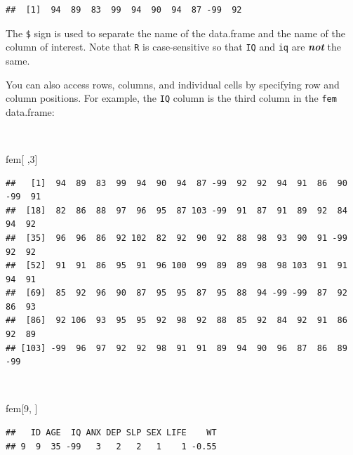 \documentclass[12pt,a4paper]{book}
\newenvironment{Shaded}{\begin{snugshade}}{\end{snugshade}}
\newcommand{\DecValTok}[1]{\textcolor[rgb]{0.00,0.00,0.81}{#1}}
\newcommand{\OperatorTok}[1]{\textcolor[rgb]{0.81,0.36,0.00}{\textbf{#1}}}
\newcommand{\NormalTok}[1]{#1}
\theoremstyle{definition}
\theoremstyle{definition}
\theoremstyle{definition}
\theoremstyle{remark}
\begin{document}
\begin{Shaded}
\end{Shaded}

\begin{verbatim}
##  [1]  94  89  83  99  94  90  94  87 -99  92
\end{verbatim}

\newpage

The \texttt{\$} sign is used to separate the name of the data.frame and
the name of the column of interest. Note that \texttt{R} is
case-sensitive so that \texttt{IQ} and \texttt{iq} are
\textbf{\emph{not}} the same.

You can also access rows, columns, and individual cells by specifying
row and column positions. For example, the \texttt{IQ} column is the
third column in the \texttt{fem} data.frame:

~

\begin{Shaded}
\begin{Highlighting}[]
\NormalTok{fem[ ,}\DecValTok{3}\NormalTok{]}
\end{Highlighting}
\end{Shaded}

\begin{verbatim}
##   [1]  94  89  83  99  94  90  94  87 -99  92  92  94  91  86  90 -99  91
##  [18]  82  86  88  97  96  95  87 103 -99  91  87  91  89  92  84  94  92
##  [35]  96  96  86  92 102  82  92  90  92  88  98  93  90  91 -99  92  92
##  [52]  91  91  86  95  91  96 100  99  89  89  98  98 103  91  91  94  91
##  [69]  85  92  96  90  87  95  95  87  95  88  94 -99 -99  87  92  86  93
##  [86]  92 106  93  95  95  92  98  92  88  85  92  84  92  91  86  92  89
## [103] -99  96  97  92  92  98  91  91  89  94  90  96  87  86  89 -99
\end{verbatim}

~

\begin{Shaded}
\begin{Highlighting}[]
\NormalTok{fem[}\DecValTok{9}\NormalTok{, ]}
\end{Highlighting}
\end{Shaded}

\begin{verbatim}
##   ID AGE  IQ ANX DEP SLP SEX LIFE    WT
## 9  9  35 -99   3   2   2   1    1 -0.55
\end{verbatim}
\end{document}
